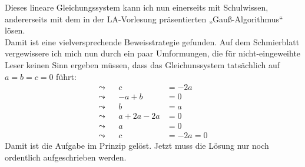 \begin{de}
    Dieses lineare Gleichungssystem kann ich nun einerseits mit Schulwissen, andererseits mit dem in der LA-Vorlesung präsentierten „Gauß-Algorithmus“ lösen. \\[0.5em]
    Damit ist eine vielversprechende Beweisstrategie gefunden. Auf dem Schmierblatt vergewissere ich mich nun durch ein paar Umformungen, die für nicht-eingeweihte Leser keinen Sinn ergeben müssen, dass das Gleichunssystem tatsächlich auf $a=b=c=0$ führt:
    \begin{align*}
        \leadsto&&   c & = -2a \\
        \leadsto&& -a + b & = 0 \\
        \leadsto&& b& = a \\
        \leadsto&& a +2a-2a & = 0 \\
        \leadsto&& a &= 0 \\
        \leadsto && c & = -2a=0
    \end{align*}
    Damit ist die Aufgabe im Prinzip gelöst. Jetzt muss die Lösung nur noch ordentlich aufgeschrieben werden.
\end{de}
 
